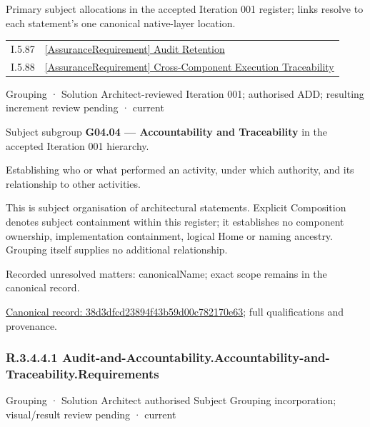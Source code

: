 Primary subject allocations in the accepted Iteration 001 register; links resolve to each statement’s one canonical native-layer location.\par
\begin{longtable}{p{.22\linewidth}p{.73\linewidth}}
I.5.87 & \hyperref[element:44b1a897fd1a41c097a1138bfee9cea6]{[AssuranceRequirement] Audit Retention} \\
I.5.88 & \hyperref[element:8014fbaa48b5435785fced72aa748da6]{[AssuranceRequirement] Cross-Component Execution Traceability} \\
\end{longtable}
\label{element:38d3dfcd23894f43b59d00c782170e63}
{\small Grouping · Solution Architect-reviewed Iteration 001; authorised ADD; resulting increment review pending · current}\par

Subject subgroup \textbf{G04.04 — Accountability and Traceability} in the accepted Iteration 001 hierarchy.



Establishing who or what performed an activity, under which authority, and its relationship to other activities.



This is subject organisation of architectural statements. Explicit Composition denotes subject containment within this register; it establishes no component ownership, implementation containment, logical Home or naming ancestry. Grouping itself supplies no additional relationship.


{\small Recorded unresolved matters: canonicalName; exact scope remains in the canonical record.}\par
{\footnotesize \href{../../../../continuum/grouping/38d3dfcd23894f43b59d00c782170e63.md}{Canonical record: 38d3dfcd23894f43b59d00c782170e63}; full qualifications and provenance.}\par
\subsubsection*{R.3.4.4.1 Audit-and-Accountability.Accountability-and-Traceability.Requirements}
\label{navigation:R.3.4.4.1}

\label{element:b12837a817d14919b5c33b35e3bb3d5a}
{\small Grouping · Solution Architect authorised Subject Grouping incorporation; visual/result review pending · current}\par


